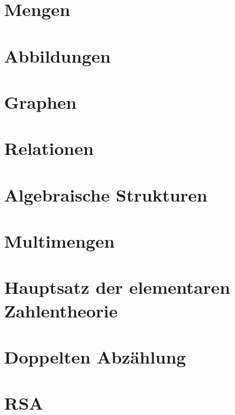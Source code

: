 \documentclass[a4paper,12pt, DIV12]{scrartcl}
\begin{document}

\newpage
\tableofcontents
\newpage
\section{Mengen}

\newpage


\newpage
\section{Abbildungen}

\newpage

\newpage

\newpage


\newpage
\section{Graphen}

\newpage

\newpage


\newpage
\section{Relationen}



%

\newpage
\section{Algebraische Strukturen}
\label{sec:algebr-strukt}


\newpage

\section{Multimengen}


\newpage
\section{Hauptsatz der elementaren Zahlentheorie}


\newpage
\section{Doppelten Abzählung}


\newpage
\section{RSA}

\end{document}
